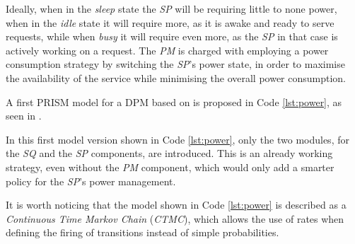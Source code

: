    Ideally, when in the \textit{sleep} state the \textit{SP} will be requiring little to none power, when in the \textit{idle} state it will require more, as it is awake and ready to serve requests, while when \textit{busy} it will require even more, as the \textit{SP} in that case is actively working on a request. The \textit{PM} is charged with employing a power consumption strategy by switching the \textit{SP}'s power state, in order to maximise the availability of the service while minimising the overall power consumption.
    
    A first PRISM model for a DPM based on \cite{qiu2001stochastic} is proposed in Code \ref{lst:power}, as seen in \cite{prism-tutorial3}.
    
    \begin{center}
      
    \end{center}
    
    In this first model version shown in Code \ref{lst:power}, only the two modules, for the \textit{SQ} and the \textit{SP} components, are introduced. This is an already working strategy, even without the \textit{PM} component, which would only add a smarter policy for the \textit{SP}'s power management.
    
    It is worth noticing that the model shown in Code \ref{lst:power} is described as a \textit{Continuous Time Markov Chain} (\textit{CTMC}), which allows the use of rates when defining the firing of transitions instead of simple probabilities.
    
